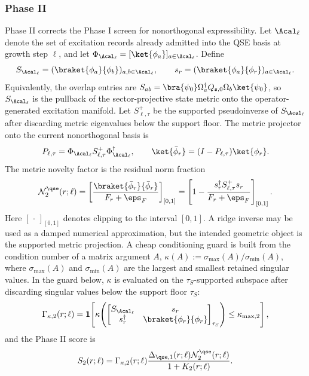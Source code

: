 \subsubsection{Phase II}
\label{sec:phase2}

Phase II corrects the Phase I screen for nonorthogonal expressibility.  Let $\Acal_\ell$ denote the set of excitation records already admitted into the QSE basis at growth step $\ell$, and let $\Phi_{\Acal_\ell}=[\ket{\phi_a}]_{a\in\Acal_\ell}$.  Define
\begin{equation}
S_{\Acal_\ell}=(\braket{\phi_a}{\phi_b})_{a,b\in\Acal_\ell},
\qquad
s_r=(\braket{\phi_a}{\phi_r})_{a\in\Acal_\ell}.
\label{eq:qse_overlap_parts}
\end{equation}
Equivalently, the overlap entries are
$S_{ab}=\bra{\psi_0}\Omega_a^\dagger Q_{\mathfrak s,0}\Omega_b\ket{\psi_0}$,
so $S_{\Acal_\ell}$ is the pullback of the sector-projective state metric onto the operator-generated excitation manifold.
Let $S_{\ell,\tau}^{+}$ be the supported pseudoinverse of $S_{\Acal_\ell}$ after discarding metric eigenvalues below the support floor.  The metric projector onto the current nonorthogonal basis is
\begin{equation}
P_{\ell,\tau}
=
\Phi_{\Acal_\ell}S_{\ell,\tau}^{+}\Phi_{\Acal_\ell}^{\dagger},
\qquad
\ket{\bar\phi_r}=(I-P_{\ell,\tau})\ket{\phi_r}.
\label{eq:qse_metric_projector}
\end{equation}
The metric novelty factor is the residual norm fraction
\begin{equation}
\mathcal N_2^{\qse}(r;\ell)
=
\left[
\frac{\braket{\bar\phi_r}{\bar\phi_r}}
{F_r+\eps_F}
\right]_{[0,1]}
=
\left[
1-\frac{s_r^\dagger S_{\ell,\tau}^{+}s_r}
{F_r+\eps_F}
\right]_{[0,1]} .
\label{eq:qse_phase2_novelty}
\end{equation}
Here $[\,\cdot\,]_{[0,1]}$ denotes clipping to the interval $[0,1]$.  A ridge inverse may be used as a damped numerical approximation, but the intended geometric object is the supported metric projection.
A cheap conditioning guard is built from the condition number of a matrix argument $A$,
$\kappa(A):=\sigma_{\max}(A)/\sigma_{\min}(A)$, where $\sigma_{\max}(A)$ and $\sigma_{\min}(A)$ are the largest and smallest retained singular values.  In the guard below, $\kappa$ is evaluated on the $\tau_S$-supported subspace after discarding singular values below the support floor $\tau_S$:
\begin{equation}
\Gamma_{\kappa,2}(r;\ell)=
\mathbf 1\!\left[
\kappa\!\left(
\begin{bmatrix}
S_{\Acal_\ell}&s_r\\
s_r^\dagger&\braket{\phi_r}{\phi_r}
\end{bmatrix}_{\tau_S}
\right)
\le\kappa_{\max,2}
\right],
\label{eq:qse_phase2_condition_guard}
\end{equation}
and the Phase II score is
\begin{equation}
S_2(r;\ell)=
\Gamma_{\kappa,2}(r;\ell)
\frac{\Delta_{\qse,1}(r;\ell)\mathcal N_2^{\qse}(r;\ell)}
{1+K_2(r;\ell)}.
\label{eq:qse_phase2_score}
\end{equation}

